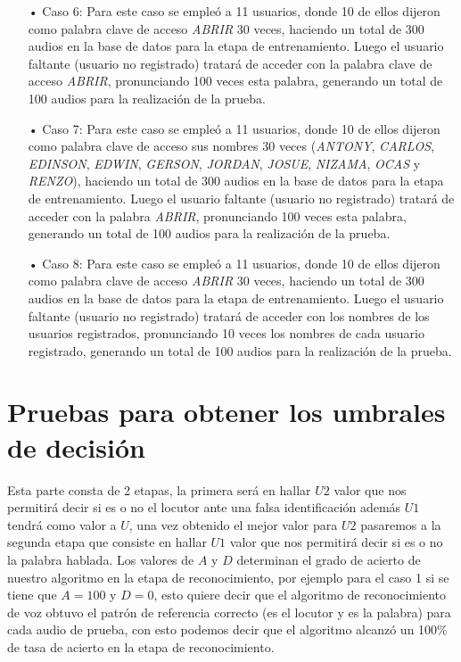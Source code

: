 \begin{enumerate}
\item[•]Caso 6: Para este caso se empleó a 11 usuarios, donde 10 de ellos dijeron como palabra clave de acceso \textit{ABRIR} 30 veces, haciendo un total de 300 audios en la base de datos para la etapa de entrenamiento. Luego el usuario faltante (usuario no registrado) tratará de acceder con la palabra clave de acceso \textit{ABRIR}, pronunciando 100 veces esta palabra, generando un total de 100 audios para la realización de la prueba.
\item[•]Caso 7: Para este caso se empleó a 11 usuarios, donde 10 de ellos dijeron como palabra clave de acceso sus nombres 30 veces (\textit{ANTONY}, \textit{CARLOS}, \textit{EDINSON}, \textit{EDWIN}, \textit{GERSON}, \textit{JORDAN}, \textit{JOSUE}, \textit{NIZAMA}, \textit{OCAS} y\textit{ RENZO}), haciendo un total de 300 audios en la base de datos para la etapa de entrenamiento. Luego el usuario faltante (usuario no registrado) tratará de acceder con la palabra \textit{ABRIR}, pronunciando 100 veces esta palabra, generando un total de 100 audios para la realización de la prueba.
\item[•]Caso 8: Para este caso se empleó a 11 usuarios, donde 10 de ellos dijeron como palabra clave de acceso \textit{ABRIR} 30 veces, haciendo un total de 300 audios en la base de datos para la etapa de entrenamiento. Luego el usuario faltante (usuario no registrado) tratará de acceder con los nombres de los usuarios registrados, pronunciando 10 veces los nombres de cada usuario registrado, generando un total de 100 audios para la realización de la prueba.
\end{enumerate}

\section{Pruebas para obtener los umbrales de decisión}
Esta parte consta de 2 etapas, la primera será en hallar $U2$ valor que nos permitirá decir si es o no el locutor ante una falsa identificación además $U1$ tendrá como valor a $U$, una vez obtenido el mejor valor para $U2$ pasaremos a la segunda etapa que consiste en hallar $U1$ valor que nos permitirá decir si es o no la palabra hablada.
\vskip 0.5cm
Los valores de $A$ y $D$ determinan el grado de acierto de nuestro algoritmo en la etapa de reconocimiento, por ejemplo para el caso 1 si se tiene que $A = 100$ y $D = 0$, esto quiere decir que el algoritmo de reconocimiento de voz obtuvo el patrón de referencia correcto (es el locutor y es la palabra) para cada audio de prueba, con esto podemos decir que el algoritmo alcanzó un 100\% de tasa de acierto en la etapa de reconocimiento.


